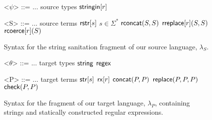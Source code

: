\documentclass{acm_proc_article-sp}
\theoremstyle{definition}
\newcommand{\lambdas}{\lambda_S}
\newcommand{\lambdap}{\lambda_P}
\newcommand{\sisubst}[3]{{\sf rreplace}[#1](#2,#3)} \newcommand{\rreplace}[3]{{\sf rreplace}[#1](#2,#3)} %
\newcommand{\coerce}[2]{ {\sf rcoerce}[#1](#2)}
\newcommand{\sistr}[1]{{\sf rstr}[#1]}   \newcommand{\rstr}[1]{{\sf rstr}[#1]} %
\newcommand{\strin}[1]{\sistr{#1}}
\newcommand{\rsconcat}[2]{{\sf rconcat}(#1,#2)} \newcommand{\rconcat}[2]{{\sf rconcat}(#1,#2)} %
\newcommand{\stringin}[1]{{\sf stringin}[#1]}
\newcommand{\tsubst}[3]{{\sf replace}(#1,#2,#3)} \newcommand{\metareplace}[3]{{\sf replace}(#1,#2,#3)} %
\newcommand{\tcheck}[2]{{\sf check}(#1, #2)}
\renewcommand{\tstr}[1]{{{\sf str}[#1]}}
\newcommand{\tconcat}[2]{{\sf concat}(#1,#2)} \newcommand{\concat}[2]{{\sf concat}(#1,#2)} %
\newcommand{\rx}[1]{ {\sf rx}[#1] }
\newcommand{\str}{{\sf string}}
\newcommand{\regex}{{\sf regex}}
\begin{document}
\begin{figure}[h]
\begin{grammar}

<$\psi$> ::=	...			\hfill	source types					\alt
$\stringin{r}$				 

<S> ::= ... \hfill source terms \alt
      $\strin{s}$ \hfill $s \in \Sigma^{*}$ \alt
      $\rsconcat{S}{S}$ \alt
      $\sisubst{r}{S}{S}$ \alt
      $\coerce{r}{S}$
\caption{Syntax for the string sanitation fragment of our source language, $\lambdas$.}
\end{grammar}
\end{figure}

\begin{figure}[h]
\begin{grammar}

<$\theta$> ::= ... \hfill target types \alt
$\str$ \alt $\regex$


<P> ::= ... \hfill target terms \alt
  $\tstr{s}$ \alt
  $\rx{r}$ \alt
  $\tconcat{P}{P}$ \alt
  $\tsubst{P}{P}{P}$ \alt
  $\tcheck{P}{P}$ 
  \end{grammar}
\caption{Syntax for the fragment of our target language, $\lambdap$, containing strings and statically constructed regular expressions.}
\label{fig:lcsSyntax}
\end{figure}
\end{document}
